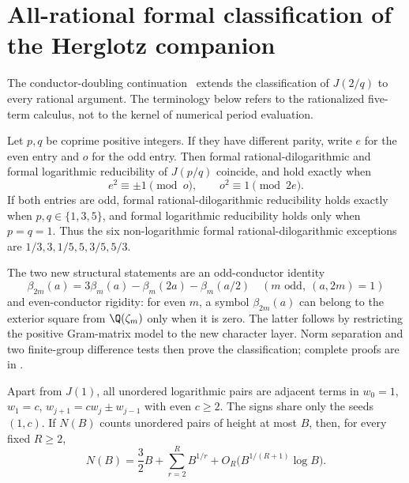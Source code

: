 \section{All-rational formal classification of the Herglotz companion}
\label{hjr:sec:classification}

The conductor-doubling continuation~\cite{hergj:continuation} extends the
classification of $J(2/q)$ to every rational argument. The terminology
below refers to the rationalized five-term calculus, not to the kernel of
numerical period evaluation.

\begin{theorem}
\label{hjr:thm:classification}
Let $p,q$ be coprime positive integers. If they have different parity,
write $e$ for the even entry and $o$ for the odd entry. Then formal
rational-dilogarithmic and formal logarithmic reducibility of $J(p/q)$
coincide, and hold exactly when
\[
 e^2\equiv\pm1\pmod o,\qquad o^2\equiv1\pmod{2e}.
\]
If both entries are odd, formal rational-dilogarithmic reducibility holds
exactly when $p,q\in\{1,3,5\}$, and formal logarithmic reducibility holds
only when $p=q=1$. Thus the six non-logarithmic formal rational-dilogarithmic
exceptions are $1/3,3,1/5,5,3/5,5/3$.
\end{theorem}

The two new structural statements are an odd-conductor identity
\[
 \beta_{2m}(a)=3\beta_m(a)-\beta_m(2a)-\beta_m(a/2)
 \quad(m\text{ odd},\ (a,2m)=1)
\]
and even-conductor rigidity: for even $m$, a symbol $\beta_{2m}(a)$
can belong to the exterior square from $\Q(\zeta_m)$ only when it is
zero. The latter follows by restricting the positive Gram-matrix model
to the new character layer. Norm separation and two finite-group
difference tests then prove the classification; complete proofs are in
\cite[Sections 2--4]{hergj:continuation}.

\begin{theorem}
\label{hjr:thm:recurrences}
Apart from $J(1)$, all unordered logarithmic pairs are adjacent terms in
$w_0=1$, $w_1=c$, $w_{j+1}=c w_j\pm w_{j-1}$ with even $c\ge2$.
The signs share only the seeds $(1,c)$. If $N(B)$ counts unordered pairs
of height at most $B$, then, for every fixed $R\ge2$,
\[
 N(B)=\frac32 B+\sum_{r=2}^{R}B^{1/r}
       +O_R\bigl(B^{1/(R+1)}\log B\bigr).
\]
\end{theorem}

